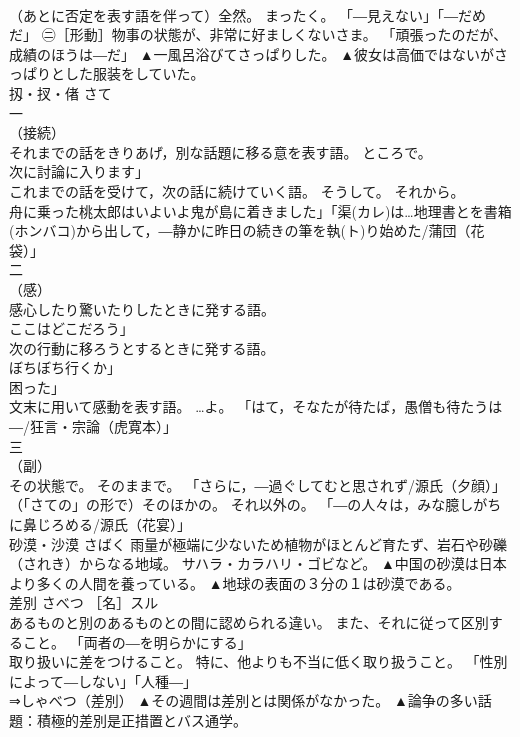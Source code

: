 \documentclass[8pt]{extreport}
\begin{document}
\begin{CJK}{UTF8}{min}
\\	（あとに否定を表す語を伴って）全然。 まったく。 「―見えない」「―だめだ」 ㊁［形動］物事の状態が、非常に好ましくないさま。 「頑張ったのだが、成績のほうは―だ」	▲一風呂浴びてさっぱりした。 ▲彼女は高価ではないがさっぱりとした服装をしていた。
\\	扨・扠・偖	さて	
\\	一
\\	（接続） 
\\	それまでの話をきりあげ，別な話題に移る意を表す語。 ところで。 
\\	次に討論に入ります」 
\\	これまでの話を受けて，次の話に続けていく語。 そうして。 それから。 
\\	舟に乗った桃太郎はいよいよ鬼が島に着きました」「渠(カレ)は…地理書とを書箱(ホンバコ)から出して，―静かに昨日の続きの筆を執(ト)り始めた/蒲団（花袋）」 
\\	二
\\	（感） 
\\	感心したり驚いたりしたときに発する語。 
\\	ここはどこだろう」 
\\	次の行動に移ろうとするときに発する語。 
\\	ぼちぼち行くか」
\\	困った」 
\\	文末に用いて感動を表す語。 …よ。 「はて，そなたが待たば，愚僧も待たうは―/狂言・宗論（虎寛本）」 
\\	三
\\	（副） 
\\	その状態で。 そのままで。 「さらに，―過ぐしてむと思されず/源氏（夕顔）」 
\\	（「さての」の形で）そのほかの。 それ以外の。 「―の人々は，みな臆しがちに鼻じろめる/源氏（花宴）」	
\\	砂漠・沙漠	さばく	雨量が極端に少ないため植物がほとんど育たず、岩石や砂礫（されき）からなる地域。 サハラ・カラハリ・ゴビなど。	▲中国の砂漠は日本より多くの人間を養っている。 ▲地球の表面の３分の１は砂漠である。
\\	差別	さべつ	［名］スル 
\\	あるものと別のあるものとの間に認められる違い。 また、それに従って区別すること。 「両者の―を明らかにする」 
\\	取り扱いに差をつけること。 特に、他よりも不当に低く取り扱うこと。 「性別によって―しない」「人種―」 
\\	⇒しゃべつ（差別）	▲その週間は差別とは関係がなかった。 ▲論争の多い話題：積極的差別是正措置とバス通学。

\end{CJK}
\end{document}
